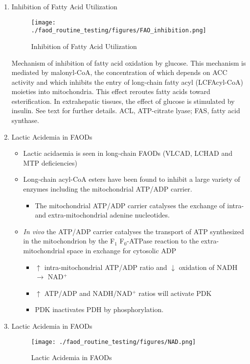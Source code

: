 \documentclass{scrartcl}
\begin{document}
\begin{enumerate}
\item Inhibition of Fatty Acid Utilization
\label{sec:orgf90092b}

\begin{figure}[htbp]
\centering
\texttt{[image: ./faod\_routine\_testing/figures/FAO\_inhibition.png]}
\caption{\label{fig:org2f2ec62}
Inhibition of Fatty Acid Utilization}
\end{figure}

Mechanism of inhibition of fatty acid oxidation by glucose. This
mechanism is mediated by malonyl-CoA, the concentration of which
depends on ACC activity and which inhibits the entry of long-chain
fatty acyl (LCFAcyl-CoA) moieties into mitochondria. This effect
reroutes fatty acids toward esterification. In extrahepatic tissues,
the effect of glucose is stimulated by insulin. See text for further
details. ACL, ATP-citrate lyase; FAS, fatty acid synthase.

\item Lactic Acidemia in FAODs
\label{sec:org5417511}
\begin{itemize}
\item Lactic acidaemia is seen in long-chain FAODs (VLCAD, LCHAD and MTP deficiencies)
\item Long-chain acyl-CoA esters have been found to inhibit a large
variety of enzymes including the mitochondrial ATP/ADP carrier.
\begin{itemize}
\item The mitochondrial ATP/ADP carrier catalyses the exchange of intra- and
extra-mitochondrial adenine nucleotides.
\end{itemize}
\item \emph{In vivo} the ATP/ADP carrier catalyses the transport of ATP
synthesized in the mitochondrion by the F\(_{\text{1}}\) F\(_{\text{0}}\)-ATPase reaction to the
extra-mitochondrial space in exchange for cytosolic ADP
\begin{itemize}
\item \(\uparrow\) intra-mitochondrial ATP/ADP ratio and \(\downarrow\) oxidation of
NADH \(\to\) NAD\(^{\text{+}}\)
\item \(\uparrow\) ATP/ADP and NADH/NAD\(^{\text{+}}\) ratios will activate PDK
\item PDK inactivates PDH by phosphorylation.
\end{itemize}
\end{itemize}

\item Lactic Acidemia in FAODs
\label{sec:orgced1585}
\begin{figure}[htbp]
\centering
\texttt{[image: ./faod\_routine\_testing/figures/NAD.png]}
\caption{\label{fig:org5d9e6a5}
Lactic Acidemia in FAODs}
\end{figure}


\end{enumerate}
\end{document}
